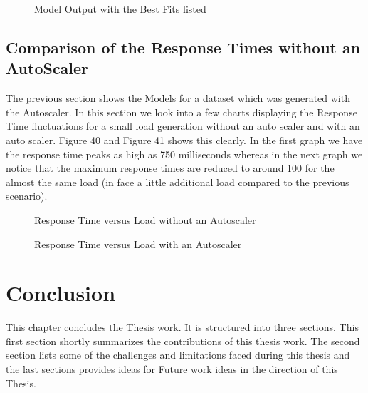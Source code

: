 \documentclass[article,type=msc,colorback,12pt,accentcolor=tud7b,table]{tudthesis}
\begin{document}
   \begin{figure}[H]
		    	\begin{center}
		    		\makebox[\textwidth]{\texttt{[image: E14]}}
		    	\end{center}
		    	\caption{Model Output with the Best Fits listed}
   \end{figure}

\subsection{Comparison of the Response Times without an AutoScaler}
The previous section shows the Models for a dataset which was generated with the Autoscaler. In this section we look into a few charts displaying the Response Time fluctuations for a small load generation without an auto scaler and with an auto scaler. Figure 40 and Figure 41 shows this clearly. In the first graph we have the response time peaks as high as 750 milliseconds whereas in the next graph we notice that the maximum response times are reduced to around 100 for the almost the same load (in face a little additional load compared to the previous scenario).

   \begin{figure}[H]
   	\begin{center}
   		\makebox[\textwidth]{\texttt{[image: E15]}}
   	\end{center}
   	\caption{Response Time versus Load without an Autoscaler}
   \end{figure}
   
      \begin{figure}[H]
      	\begin{center}
      		\makebox[\textwidth]{\texttt{[image: E16]}}
      	\end{center}
      	\caption{Response Time versus Load with an Autoscaler}
      \end{figure}

\cleardoublepage
\section{Conclusion}	 

This chapter concludes the Thesis work. It is structured into three sections. This first section shortly summarizes the contributions of this thesis work. The second section lists some of the challenges and limitations faced during this thesis and the last sections provides ideas for Future work ideas in the direction of this Thesis.
 
\end{document}
